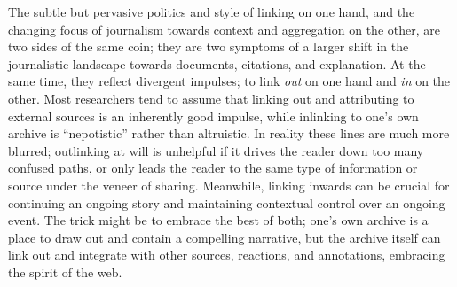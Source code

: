 The subtle but pervasive politics and style of linking on one hand, and the changing focus of journalism towards context and aggregation on the other, are two sides of the same coin; they are two symptoms of a larger shift in the journalistic landscape towards documents, citations, and explanation. At the same time, they reflect divergent impulses; to link \emph{out} on one hand and \emph{in} on the other. Most researchers tend to assume that linking out and attributing to external sources is an inherently good impulse, while inlinking to one's own archive is ``nepotistic'' rather than altruistic.\autocite[213]{chakrabarti_mining_2003} In reality these lines are much more blurred; outlinking at will is unhelpful if it drives the reader down too many confused paths, or only leads the reader to the same type of information or source under the veneer of sharing. Meanwhile, linking inwards can be crucial for continuing an ongoing story and maintaining contextual control over an ongoing event. The trick might be to embrace the best of both; one's own archive is a place to draw out and contain a compelling narrative, but the archive itself can link out and integrate with other sources, reactions, and annotations, embracing the spirit of the web.




